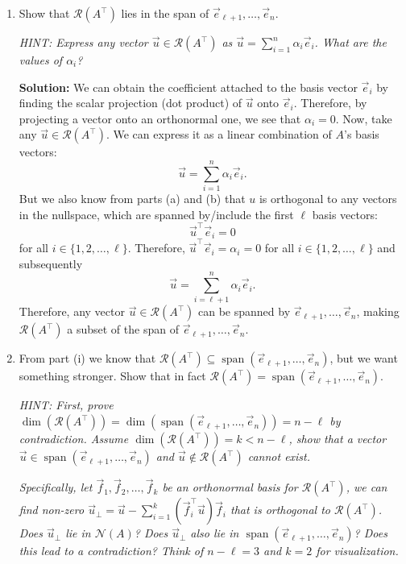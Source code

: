 \documentclass[10pt]{article}
\theoremstyle{definition}
\theoremstyle{plain}
\newcommand{\NN}{\mathcal{N}}
\newcommand{\Range}{\mathcal{R}}
\DeclareMathOperator{\spn}{span}
\newcommand{\vv}[1]{\vec{#1}}
\begin{document}
\begin{enumerate}[label=(\alph*)]
\begin{enumerate}[label=\roman*.]
\item Show that $\Range\!\left(A^\top\right)$ lies in the span of $\vv{e}_{\ell+1}, \ldots, \vv{e}_n$.

\textit{HINT: Express any vector $\vv{u} \in \Range\!\left(A^\top\right)$ as $\vv{u} = \sum_{i=1}^{n} \alpha_i \vv{e}_i$. What are the values of $\alpha_i$?}

\textbf{Solution:} We can obtain the coefficient attached to the basis vector $\vv{e}_i$ by finding the scalar projection (dot product) of $\vv{u}$ onto $\vv{e}_i$. Therefore, by projecting a vector onto an orthonormal one, we see that $\alpha_i = 0$. Now, take any $\vv{u} \in \Range\!\left(A^\top\right)$. We can express it as a linear combination of $A$'s basis vectors:
\begin{equation}
\vv{u} = \sum_{i=1}^{n} \alpha_i \vv{e}_i.
\end{equation}
But we also know from parts (a) and (b) that $u$ is orthogonal to any vectors in the nullspace, which are spanned by/include the first $\ell$ basis vectors:
\begin{equation}
\vv{u}^\top \vv{e}_i = 0
\end{equation}
for all $i \in \{1, 2, \ldots, \ell\}$. Therefore, $\vv{u}^\top \vv{e}_i = \alpha_i = 0$ for all $i \in \{1, 2, \ldots, \ell\}$ and subsequently
\begin{equation}
\vv{u} = \sum_{i=\ell+1}^{n} \alpha_i \vv{e}_i.
\end{equation}
Therefore, any vector $\vv{u} \in \Range\!\left(A^\top\right)$ can be spanned by $\vv{e}_{\ell+1}, \ldots, \vv{e}_n$, making $\Range\!\left(A^\top\right)$ a subset of the span of $\vv{e}_{\ell+1}, \ldots, \vv{e}_n$.

\item From part (i) we know that $\Range\!\left(A^\top\right) \subseteq \spn(\vv{e}_{\ell+1}, \ldots, \vv{e}_n)$, but we want something stronger. Show that in fact $\Range\!\left(A^\top\right) = \spn(\vv{e}_{\ell+1}, \ldots, \vv{e}_n)$.

\textit{HINT: First, prove $\dim\!\left(\Range\!\left(A^\top\right)\right) = \dim(\spn(\vv{e}_{\ell+1}, \ldots, \vv{e}_n)) = n - \ell$ by contradiction. Assume $\dim\!\left(\Range\!\left(A^\top\right)\right) = k < n - \ell$, show that a vector $\vv{u} \in \spn(\vv{e}_{\ell+1}, \ldots, \vv{e}_n)$ and $\vv{u} \notin \Range\!\left(A^\top\right)$ cannot exist.}

\textit{Specifically, let $\vv{f}_1, \vv{f}_2, \ldots, \vv{f}_k$ be an orthonormal basis for $\Range\!\left(A^\top\right)$, we can find non-zero $\vv{u}_\perp = \vv{u} - \sum_{i=1}^{k} (\vv{f}_i^\top \vv{u}) \vv{f}_i$ that is orthogonal to $\Range\!\left(A^\top\right)$. Does $\vv{u}_\perp$ lie in $\NN(A)$? Does $\vv{u}_\perp$ also lie in $\spn(\vv{e}_{\ell+1}, \ldots, \vv{e}_n)$? Does this lead to a contradiction? Think of $n - \ell = 3$ and $k = 2$ for visualization.}


\end{enumerate}
\end{enumerate}
\end{document}
